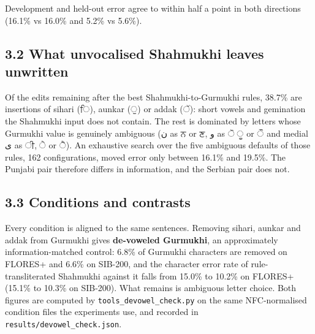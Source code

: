 Development and held-out error agree to within half a point in both
directions (16.1\% vs 16.0\% and 5.2\% vs 5.6\%).

\hypertarget{what-unvocalised-shahmukhi-leaves-unwritten}{%
\subsection{3.2 What unvocalised Shahmukhi leaves
unwritten}\label{what-unvocalised-shahmukhi-leaves-unwritten}}

Of the edits remaining after the best Shahmukhi-to-Gurmukhi rules,
38.7\% are insertions of sihari ({\gurfont ਿ}), aunkar ({\gurfont ੁ}) or addak ({\gurfont ੱ}): short vowels
and gemination the Shahmukhi input does not contain. The rest is
dominated by letters whose Gurmukhi value is genuinely ambiguous ({\arabfont\beginR ن\endR} as {\gurfont ਨ}
or {\gurfont ਣ}, {\arabfont\beginR و\endR} as {\gurfont ੋ} {\gurfont ੂ} or {\gurfont ੌ} and medial {\arabfont\beginR ی\endR} as {\gurfont ੀ}, {\gurfont ੇ} or {\gurfont ੈ}). An exhaustive search
over the five ambiguous defaults of those rules, 162 configurations,
moved error only between 16.1\% and 19.5\%. The Punjabi pair therefore
differs in information, and the Serbian pair does not.

\hypertarget{conditions-and-contrasts}{%
\subsection{3.3 Conditions and
contrasts}\label{conditions-and-contrasts}}

Every condition is aligned to the same sentences. Removing sihari,
aunkar and addak from Gurmukhi gives \textbf{de-voweled Gurmukhi}, an
approximately information-matched control: 6.8\% of Gurmukhi characters
are removed on FLORES+ and 6.6\% on SIB-200, and the character error
rate of rule-transliterated Shahmukhi against it falls from 15.0\% to
10.2\% on FLORES+ (15.1\% to 10.3\% on SIB-200). What remains is
ambiguous letter choice. Both figures are computed by
\texttt{tools\_devowel\_check.py} on the same NFC-normalised condition
files the experiments use, and recorded in
\texttt{results/devowel\_check.json}.

